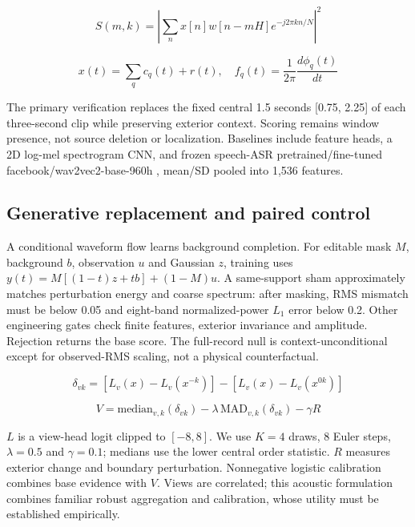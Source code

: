 \documentclass[11pt,letterpaper]{article}
\begin{document}
\begin{equation}\label{eq:stft}
S(m,k)=\left|\sum_n x[n]w[n-mH]e^{-j2\pi kn/N}\right|^2
\end{equation}

\begin{equation}\label{eq:hht}
x(t)=\sum_q c_q(t)+r(t),\quad f_q(t)=\frac{1}{2\pi}\frac{d\phi_q(t)}{dt}
\end{equation}

The primary verification replaces the fixed central 1.5 seconds [0.75, 2.25] of each three-second clip while preserving exterior context. Scoring remains window presence, not source deletion or localization. Baselines include feature heads, a 2D log-mel spectrogram CNN, and frozen speech-ASR pretrained/fine-tuned facebook/wav2vec2-base-960h \cite{wav2vec2}, mean/SD pooled into 1,536 features.\par

\subsection{Generative replacement and paired control}

A conditional waveform flow \cite{flowmatching} learns background completion. For editable mask \(M\), background \(b\), observation \(u\) and Gaussian \(z\), training uses \(y(t)=M[(1-t)z+tb]+(1-M)u\). A same-support sham approximately matches perturbation energy and coarse spectrum: after masking, RMS mismatch must be below 0.05 and eight-band normalized-power \(L_1\) error below 0.2. Other engineering gates check finite features, exterior invariance and amplitude. Rejection returns the base score. The full-record null is context-unconditional except for observed-RMS scaling, not a physical counterfactual.\par

\begin{equation}\label{eq:delta}
\delta_{vk}=[L_v(x)-L_v(x^{-k})]-[L_v(x)-L_v(x^{0k})]
\end{equation}

\begin{equation}\label{eq:score}
V=\mathrm{median}_{v,k}(\delta_{vk})-\lambda\,\mathrm{MAD}_{v,k}(\delta_{vk})-\gamma R
\end{equation}

\(L\) is a view-head logit clipped to \([-8,8]\). We use \(K=4\) draws, 8 Euler steps, \(\lambda=0.5\) and \(\gamma=0.1\); medians use the lower central order statistic. \(R\) measures exterior change and boundary perturbation. Nonnegative logistic calibration combines base evidence with \(V\). Views are correlated; this acoustic formulation combines familiar robust aggregation and calibration, whose utility must be established empirically.\par
\end{document}
